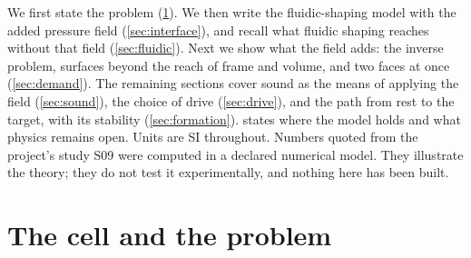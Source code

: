 \documentclass[11pt,a4paper]{article}
\numberwithin{equation}{section}
\begin{document}
We first state the problem (\cref{sec:problem}). We then write the
fluidic-shaping model with the added pressure field (\cref{sec:interface}), and
recall what fluidic shaping reaches without that field (\cref{sec:fluidic}).
Next we show what the field adds: the inverse problem, surfaces beyond the reach
of frame and volume, and two faces at once (\cref{sec:demand}). The remaining
sections cover sound as the means of applying the field (\cref{sec:sound}), the
choice of drive (\cref{sec:drive}), and the path from rest to the target, with
its stability (\cref{sec:formation}).  states where the model
holds and what physics remains open. Units are SI throughout. Numbers quoted
from the project's study S09 were computed in a declared numerical model. They
illustrate the theory; they do not test it experimentally, and nothing here
has been built.

\section{The cell and the problem}\label{sec:problem}
\end{document}
